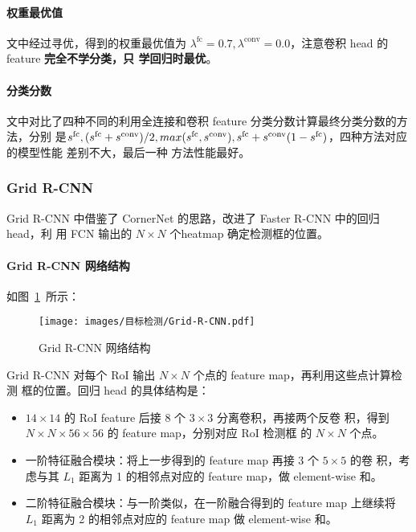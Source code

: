 \paragraph{权重最优值}
文中经过寻优，得到的权重最优值为 $\lambda^{\mathrm{fc}} = 0.7,
\lambda^{\mathrm{\mathrm{conv}}} = 0.0$，注意卷积 head 的 feature \textbf{完全不学分类，只
学回归时最优}。

\paragraph{分类分数}
文中对比了四种不同的利用全连接和卷积 feature 分类分数计算最终分类分数的方法，分别
是$s^{\mathrm{fc}}, (s^{\mathrm{fc}} + s^{\mathrm{conv}})/2,
\\max(s^{\mathrm{fc}}, s^{\mathrm{conv}}), s^{\mathrm{fc}} +
s^{\mathrm{conv}}(1-s^{\mathrm{fc}})$，四种方法对应的模型性能 差别不大，最后一种
方法性能最好。

\subsubsection{Grid R-CNN}
Grid R-CNN 中借鉴了 CornerNet 的思路，改进了 Faster R-CNN 中的回归 head，利
用 FCN 输出的 $N \times N$ 个heatmap 确定检测框的位置。

\paragraph{Grid R-CNN 网络结构}
如图~\ref{fig:Grid-RCNN}~所示：

\begin{figure}[ht]
  \centering
  \texttt{[image: images/目标检测/Grid-R-CNN.pdf]}
  \caption{Grid R-CNN 网络结构}\label{fig:Grid-RCNN}
\end{figure}

Grid R-CNN 对每个 RoI 输出 $N \times N$ 个点的 feature map，再利用这些点计算检测
框的位置。回归 head 的具体结构是：

\begin{itemize}
  \item $14 \times 14$ 的 RoI feature 后接 8 个 $3 \times 3$ 分离卷积，再接两个反卷
    积，得到 $N \times N \times 56 \times 56$ 的 feature map，分别对应 RoI 检测框
    的 $N \times N$ 个点。
  \item 一阶特征融合模块：将上一步得到的 feature map 再接 3 个 $5 \times 5$ 的卷
    积，考虑与其 $L_1$ 距离为 1 的相邻点对应的 feature map，做 element-wise 和。
  \item 二阶特征融合模块：与一阶类似，在一阶融合得到的 feature map 上继续将
    $L_1$ 距离为 2 的相邻点对应的 feature map 做 element-wise 和。
\end{itemize}

